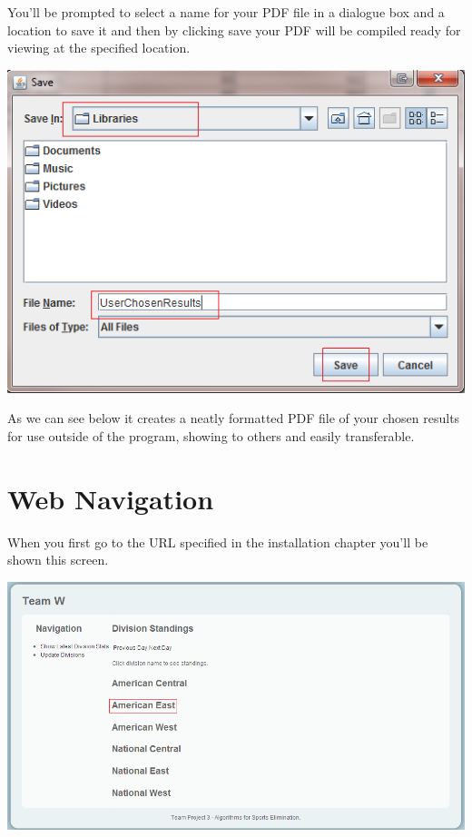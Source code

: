 \newpage

You'll be prompted to select a name for your PDF file in a dialogue box and a
location to save it and then by clicking save your PDF will be compiled ready
for viewing at the specified location.

\includegraphics[width=\linewidth,height=\measurepage,keepaspectratio]
{images/userManualDesk14.png}

As we can see below it creates a neatly formatted PDF file of your chosen
results for use outside of the program, showing to others and easily
transferable.


\newpage

\section{Web Navigation}

When you first go to the URL specified in the installation chapter you'll be
shown this screen.

\includegraphics[width=\linewidth,keepaspectratio]{images/userManualWeb1.png}

